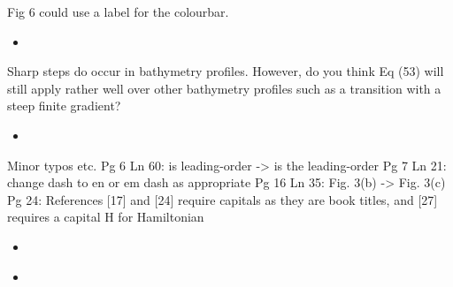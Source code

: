 \documentclass[11pt]{article}
\newcommand{\comment}[1]{{\color{blue} #1}}
\begin{document}
\noindent
\comment{Fig 6 could use a label for the colourbar.}

\begin{itemize}
\item
\end{itemize}

\noindent
\comment{Sharp steps do occur in bathymetry profiles. However, do you think Eq (53) will still apply rather well over other bathymetry profiles such as a transition with a steep finite gradient?}

\begin{itemize}
\item
\end{itemize}

\noindent
\comment{Minor typos etc.
Pg 6 Ln 60: is leading-order -> is the leading-order
Pg 7 Ln 21: change dash to en or em dash as appropriate
Pg 16 Ln 35: Fig. 3(b) -> Fig. 3(c)
Pg 24: References [17] and [24] require capitals as they are book titles, and [27] requires a capital H for Hamiltonian}

\begin{itemize}
\item
\end{itemize}

\noindent
\comment{}

\begin{itemize}
\item
\end{itemize}
\end{document}
